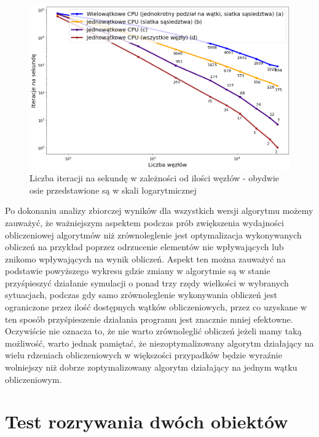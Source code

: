 \documentclass[12pt, letterpaper]{report}
\begin{document}
    \begin{figure}[H]
        \centering
        \includegraphics[width=16cm]{performance_all_best_worst_log_log.png}
        \caption{
            Liczba iteracji na sekundę w zależności od ilości węzłów - 
            obydwie osie przedstawione są w skali logarytmicznej
        }
    \end{figure}

    Po dokonaniu analizy zbiorczej wyników dla wszystkich wersji algorytmu możemy zauważyć, że
    ważniejszym aspektem podczas prób zwiększenia wydajności obliczeniowej algorytmów niż zrównoleglenie 
    jest optymalizacja wykonywanych obliczeń na przykład poprzez odrzucenie elementów nie wpływających 
    lub znikomo wpływających na wynik obliczeń. Aspekt ten można zauważyć na podstawie powyższego wykresu
    gdzie zmiany w algorytmie są w stanie przyśpieszyć działanie symulacji o ponad trzy rzędy wielkości w
    wybranych sytuacjach, podczas gdy samo zrównoleglenie wykonywania obliczeń jest ograniczone przez
    ilość dostępnych wątków obliczeniowych, przez co uzyskane w ten sposób przyśpieszenie działania 
    programu jest znacznie mniej efektowne. \\
    
    Oczywiście nie oznacza to, że nie warto zrównoleglić obliczeń
    jeżeli mamy taką możliwość, warto jednak pamiętać, że niezoptymalizowany algorytm działający 
    na wielu rdzeniach obliczeniowych w większości przypadków będzie wyraźnie wolniejszy niż dobrze
    zoptymalizowany algorytm działający na jednym wątku obliczeniowym.

    \clearpage
    \section{Test rozrywania dwóch obiektów}
\end{document}
